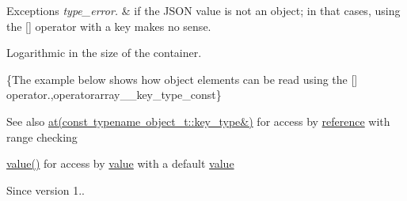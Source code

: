 \begin{DoxyExceptions}{Exceptions}
{\em type\+\_\+error.} & if the J\+S\+ON value is not an object; in that cases, using the \mbox{[}\mbox{]} operator with a key makes no sense.\\
\hline
\end{DoxyExceptions}
Logarithmic in the size of the container.

\{The example below shows how object elements can be read using the {\ttfamily \mbox{[}\mbox{]}} operator.,operatorarray\+\_\+\+\_\+key\+\_\+type\+\_\+const\}

\begin{DoxySeeAlso}{See also}
\mbox{\hyperlink{classnlohmann_1_1basic__json_a93403e803947b86f4da2d1fb3345cf2c}{at(const typename object\+\_\+t\+::key\+\_\+type\&)}} for access by \mbox{\hyperlink{classnlohmann_1_1basic__json_ac6a5eddd156c776ac75ff54cfe54a5bc}{reference}} with range checking 

\mbox{\hyperlink{classnlohmann_1_1basic__json_adcf8ca5079f5db993820bf50036bf45d}{value()}} for access by \mbox{\hyperlink{classnlohmann_1_1basic__json_adcf8ca5079f5db993820bf50036bf45d}{value}} with a default \mbox{\hyperlink{classnlohmann_1_1basic__json_adcf8ca5079f5db993820bf50036bf45d}{value}}
\end{DoxySeeAlso}
\begin{DoxySince}{Since}
version 1.. 
\end{DoxySince}
\mbox{\label{classnlohmann_1_1basic__json_ac6946dffeb3be5aa173645f0467a44b3}} 
